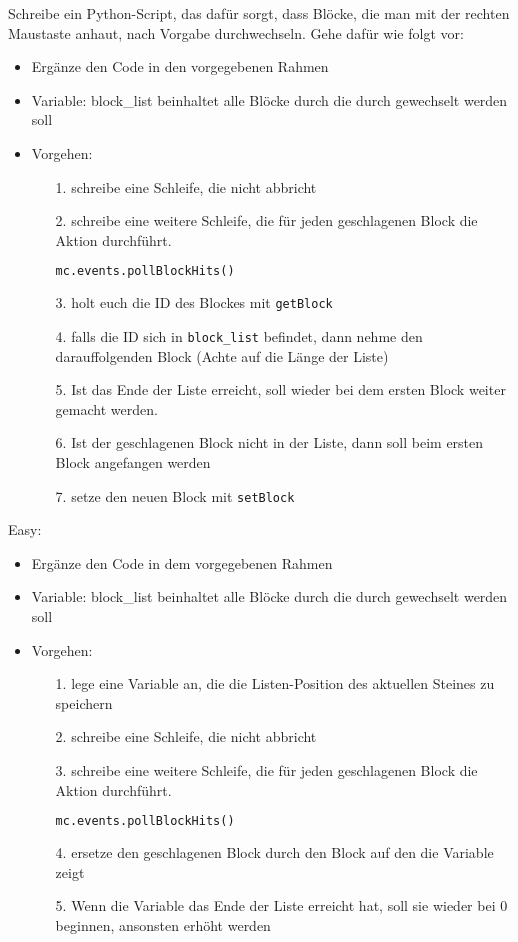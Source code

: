 \large Schreibe ein Python-Script, das dafür sorgt, dass Blöcke, die man mit der rechten Maustaste anhaut, nach Vorgabe durchwechseln.
Gehe dafür wie folgt vor:
\begin{itemize}
	\item Ergänze den Code in den vorgegebenen Rahmen
	\item Variable: block\_list beinhaltet alle Blöcke durch die durch gewechselt werden soll
	\item Vorgehen:
	\begin{itemize}
		\item[1.] schreibe eine Schleife, die nicht abbricht
		\item[2.] schreibe eine weitere Schleife, die für jeden geschlagenen Block die Aktion durchführt.\begin{lstlisting}[language=Python]
		mc.events.pollBlockHits()
		\end{lstlisting}
		\item[3.] holt euch die ID des Blockes mit \texttt{getBlock}
		\item[4.] falls die ID sich in \texttt{block\_list} befindet, dann nehme den darauffolgenden Block (Achte auf die Länge der Liste)
		\item[5.] Ist das Ende der Liste erreicht, soll wieder bei dem ersten Block weiter gemacht werden.
		\item[6.] Ist der geschlagenen Block nicht in der Liste, dann soll beim ersten Block angefangen werden
		\item[7.] setze den neuen Block mit \texttt{setBlock}
	\end{itemize}
\end{itemize}
Easy:
\begin{itemize}
	\item Ergänze den Code in dem vorgegebenen Rahmen
	\item Variable: block\_list beinhaltet alle Blöcke durch die durch gewechselt werden soll
	\item Vorgehen:
	\begin{itemize}
		\item[1.] lege eine Variable an, die die Listen-Position des aktuellen Steines zu speichern
		\item[2.] schreibe eine Schleife, die nicht abbricht
		\item[3.] schreibe eine weitere Schleife, die für jeden geschlagenen Block die Aktion durchführt.\begin{lstlisting}[language=Python]
		mc.events.pollBlockHits()
		\end{lstlisting}
		\item[4.] ersetze den geschlagenen Block durch den Block auf den die Variable zeigt
		\item[5.] Wenn die Variable das Ende der Liste erreicht hat, soll sie wieder bei 0 beginnen, ansonsten erhöht werden
	\end{itemize}
\end{itemize}
